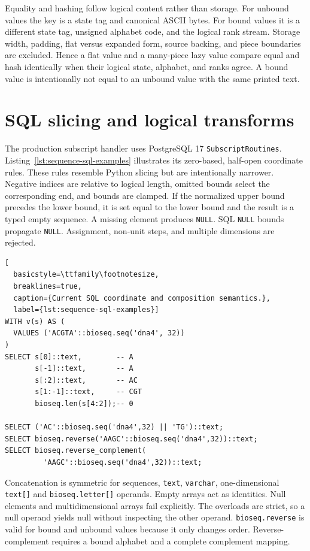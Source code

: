 Equality and hashing follow logical content rather than storage.  For unbound
values the key is a state tag and canonical ASCII bytes.  For bound values it
is a different state tag, unsigned alphabet code, and the logical rank stream.
Storage width, padding, flat versus expanded form, source backing, and piece
boundaries are excluded.  Hence a flat value and a many-piece lazy value
compare equal and hash identically when their logical state, alphabet, and
ranks agree.  A bound value is intentionally not equal to an unbound value
with the same printed text.

\section{SQL slicing and logical transforms}
\label{sec:sequence-sql-slicing}

The production subscript handler uses PostgreSQL 17
\texttt{SubscriptRoutines}.  Listing~\ref{lst:sequence-sql-examples}
illustrates its zero-based, half-open coordinate rules.  These rules resemble
Python slicing but are intentionally narrower.  Negative indices are relative
to logical length, omitted bounds select the corresponding end, and bounds are
clamped.  If the normalized upper bound precedes the lower bound, it is set
equal to the lower bound and the result is a typed empty sequence.  A missing
element produces \texttt{NULL}.  SQL \texttt{NULL} bounds propagate
\texttt{NULL}.  Assignment, non-unit steps, and multiple dimensions are
rejected.

\begin{lstlisting}[
  basicstyle=\ttfamily\footnotesize,
  breaklines=true,
  caption={Current SQL coordinate and composition semantics.},
  label={lst:sequence-sql-examples}]
WITH v(s) AS (
  VALUES ('ACGTA'::bioseq.seq('dna4', 32))
)
SELECT s[0]::text,        -- A
       s[-1]::text,       -- A
       s[:2]::text,       -- AC
       s[1:-1]::text,     -- CGT
       bioseq.len(s[4:2]);-- 0

SELECT ('AC'::bioseq.seq('dna4',32) || 'TG')::text;
SELECT bioseq.reverse('AAGC'::bioseq.seq('dna4',32))::text;
SELECT bioseq.reverse_complement(
         'AAGC'::bioseq.seq('dna4',32))::text;
\end{lstlisting}

Concatenation is symmetric for sequences, \texttt{text},
\texttt{varchar}, one-dimensional \texttt{text[]} and
\texttt{bioseq.letter[]} operands.  Empty arrays act as identities.  Null
elements and multidimensional arrays fail explicitly.  The overloads are
strict, so a null operand yields null without inspecting the other operand.
\texttt{bioseq.reverse} is valid for bound and unbound values because it only
changes order.  Reverse-complement requires a bound alphabet and a complete
complement mapping.

